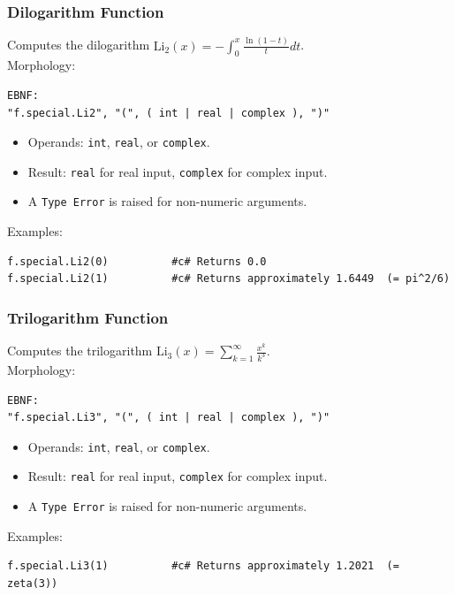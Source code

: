 \subsubsection{Dilogarithm Function}
Computes the dilogarithm $\text{Li}_2(x) = -\int_0^x \frac{\ln(1-t)}{t} dt$. \\
Morphology:
\begin{verbatim}
EBNF:
"f.special.Li2", "(", ( int | real | complex ), ")"
\end{verbatim}
\begin{itemize}
\item Operands: \texttt{int}, \texttt{real}, or \texttt{complex}.
\item Result: \texttt{real} for real input, \texttt{complex} for complex input.
\item A \texttt{Type Error} is raised for non-numeric arguments.
\end{itemize}
Examples:
\begin{verbatim}
f.special.Li2(0)          #c# Returns 0.0
f.special.Li2(1)          #c# Returns approximately 1.6449  (= pi^2/6)
\end{verbatim}

\subsubsection{Trilogarithm Function}
Computes the trilogarithm $\text{Li}_3(x) = \sum_{k=1}^{\infty} \frac{x^k}{k^3}$. \\
Morphology:
\begin{verbatim}
EBNF:
"f.special.Li3", "(", ( int | real | complex ), ")"
\end{verbatim}
\begin{itemize}
\item Operands: \texttt{int}, \texttt{real}, or \texttt{complex}.
\item Result: \texttt{real} for real input, \texttt{complex} for complex input.
\item A \texttt{Type Error} is raised for non-numeric arguments.
\end{itemize}
Examples:
\begin{verbatim}
f.special.Li3(1)          #c# Returns approximately 1.2021  (= zeta(3))
\end{verbatim}

